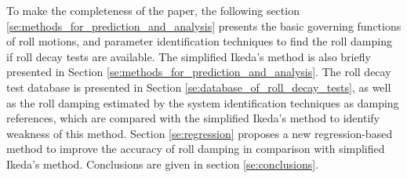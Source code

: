 To make the completeness of the paper, the following section \ref{se:methods_for_prediction_and_analysis} presents the basic governing functions of roll motions, and parameter identification techniques to find the roll damping if roll decay tests are available. The simplified Ikeda's method is also briefly presented in Section \ref{se:methods_for_prediction_and_analysis}. The roll decay test database is presented in Section \ref{se:database_of_roll_decay_tests}, as well as the roll damping estimated by the system identification techniques as damping references, which are compared with the simplified Ikeda's method to identify weakness of this method. Section \ref{se:regression} proposes a new regression-based method to improve the accuracy of roll damping in comparison with simplified Ikeda's method. Conclusions are given in section \ref{se:conclusions}.  
